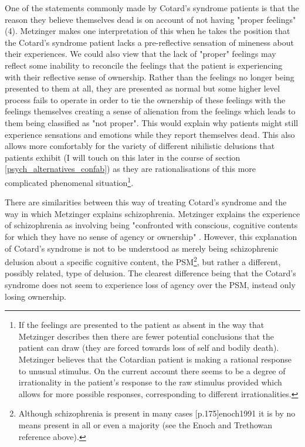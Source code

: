 One of the statements commonly made by Cotard's syndrome patients is that the reason they believe themselves dead is on account of not having "proper feelings" (4). Metzinger makes one interpretation of this when he takes the position that the Cotard's syndrome patient lacks a pre-reflective sensation of mineness about their experiences. We could also view that the lack of "proper" feelings may reflect some inability to reconcile the feelings that the patient is experiencing with their reflective sense of ownership. Rather than the feelings no longer being presented to them at all, they are presented as normal but some higher level process fails to operate in order to tie the ownership of these feelings with the feelings themselves creating a sense of alienation from the feelings which leads to them being classified as "not proper". This would explain why patients might still experience sensations and emotions while they report themselves dead. This also allows more comfortably for the variety of different nihilistic delusions that patients exhibit (I will touch on this later in the course of section \ref{psych_alternatives_confab}) as they are rationalisations of this more complicated phenomenal situation\footnote{If the feelings are presented to the patient as absent in the way that Metzinger describes then there are fewer potential conclusions that the patient can draw (they are forced towards loss of self and bodily death). Metzinger believes that the Cotardian patient is making a rational response to unusual stimulus. On the current account there seems to be a degree of irrationality in the patient's response to the raw stimulus provided which allows for more possible responses, corresponding to different irrationalities.}.

There are similarities between this way of treating Cotard's syndrome and the way in which Metzinger explains schizophrenia. Metzinger explains the experience of schizophrenia as involving being "confronted with conscious, cognitive contents for which they have no sense of agency or ownership" \cite[p. 445]{metzinger2003}. However, this explanation of Cotard's syndrome is not to be understood as merely being schizophrenic delusion about a specific cognitive content, the PSM\footnote{Although schizophrenia is present in many cases \cite[p. 185]{berrios1995b}[p.175]{enoch1991} it is by no means present in all or even a majority (see the Enoch and Trethowan reference above).}, but rather a different, possibly related, type of delusion. The clearest difference being that the Cotard's syndrome does not seem to experience loss of agency over the PSM, instead only losing ownership.

